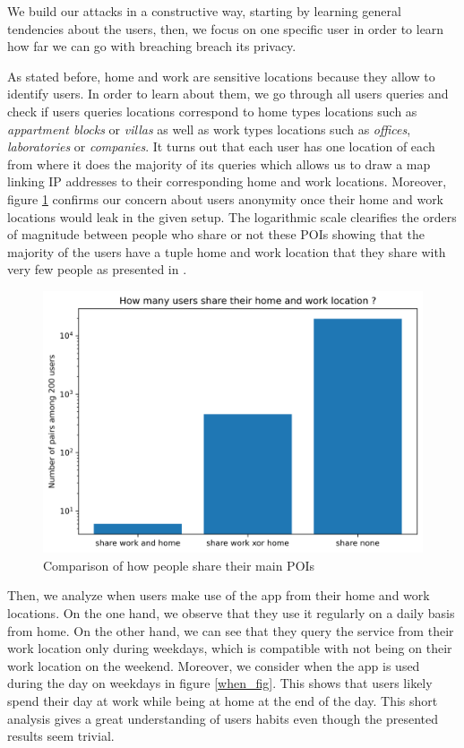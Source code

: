 \documentclass[10pt,conference,compsocconf]{IEEEtran}
\begin{document}
We build our attacks in a constructive way, starting by learning general tendencies about the users, then, we focus on one specific user in order to learn how far we can go with breaching breach its privacy.

As stated before, home and work are sensitive locations because they allow to identify users. In order to learn about them, we go through all users queries and check if users queries locations correspond to home types locations such as \textit{appartment blocks} or \textit{villas} as well as work types locations such as \textit{offices}, \textit{laboratories} or \textit{companies}. It turns out that each user has one location of each from where it does the majority of its queries which allows us to draw a map linking IP addresses to their corresponding home and work locations. Moreover, figure \ref{share_fig} confirms our concern about users anonymity once their home and work locations would leak in the given setup. The logarithmic scale clearifies the orders of magnitude between people who share or not these POIs showing that the majority of the users have a tuple home and work location that they share with very few people as presented in \cite{on}.

\begin{figure}
  \includegraphics[width=\columnwidth]{share.png}
  \caption{Comparison of how people share their main POIs}
  \label{share_fig}
\end{figure}

Then, we analyze when users make use of the app from their home and work locations. On the one hand, we observe that they use it regularly on a daily basis from home. On the other hand, we can see that they query the service from their work location only during weekdays, which is compatible with not being on their work location on the weekend. Moreover, we consider when the app is used during the day on weekdays in figure \ref{when_fig}. This shows that users likely spend their day at work while being at home at the end of the day. This short analysis gives a great understanding of users habits even though the presented results seem trivial.
\end{document}
